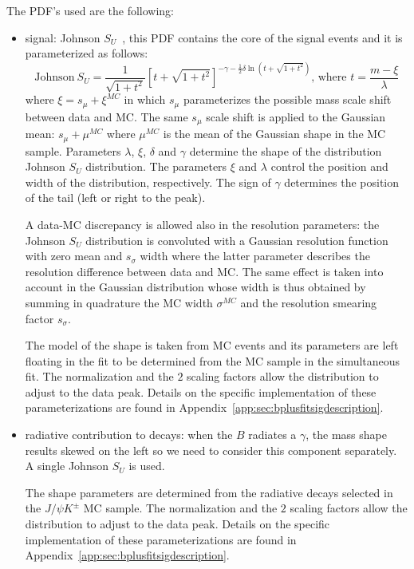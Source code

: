 The PDF's used are the following:
\begin{itemize}
    \setlength{\itemsep}{0pt}%
	\setlength{\parskip}{0pt}%
    \item \BpmKpmJpsi{} signal:
	Johnson $S_U$~\cite{Johnson}, this PDF contains the core of the signal events and
	it is parameterized as follows:
	\begin{equation}
	    \mathrm{Johnson}~S_U =
	    \frac{1}{\sqrt{1+t^2}}\left[t+\sqrt{1+t^2}\right]^{-\gamma-\frac{1}{2}\delta\ln{(t+\sqrt{1+t^2})}} \text{, where } t = \frac{m-\xi}{\lambda}
	\end{equation}
	where $\xi = s_\mu + \xi^{MC}$ in which $s_\mu$ parameterizes the
	possible mass scale shift between data and MC. The same $s_\mu$
	scale shift is applied to the Gaussian mean: $s_\mu+\mu^{MC}$ where
	$\mu^{MC}$ is the mean of the Gaussian shape in the \BpmKpmJpsi{} MC sample.
	Parameters $\lambda$, $\xi$, $\delta$ and $\gamma$ determine the shape
	of the distribution Johnson $S_U$ distribution. The parameters $\xi$
	and $\lambda$ control the position and width of the distribution,
	respectively. The sign of $\gamma$ determines the position of
	the tail (left or right to the peak).

	A data-MC discrepancy is allowed also in the resolution parameters:
	the Johnson $S_U$ distribution is convoluted with a Gaussian resolution function
	with zero mean and $s_\sigma$ width where the latter parameter describes 
	the resolution difference between data and MC.
	The same effect is taken into account in the Gaussian distribution
	whose width is thus obtained by summing in quadrature the MC width
	$\sigma^{MC}$ and the resolution smearing factor $s_\sigma$.

	The model of the shape is taken from \BpmKpmJpsi{} MC events
	and its parameters are left floating in the fit to be determined from
	the \BpmKpmJpsi{} MC sample in the simultaneous fit.
	The normalization and the $2$ scaling factors allow the distribution to
	adjust to the data peak.
	Details on the specific implementation of these parameterizations
	are found in Appendix~\ref{app:sec:bplusfitsigdescription}.

    \item radiative contribution to \BpmKpmJpsi{} decays: when the $B$ radiates a $\gamma$,
	the mass shape results skewed on the left so we need to consider
	this component separately. A single Johnson $S_U$ is used. 

	The shape parameters are determined from the radiative decays selected
	in the $J/\psi K^\pm$ MC sample.
	The normalization and the $2$ scaling factors allow the distribution to
	adjust to the data peak.
	Details on the specific implementation of these parameterizations
	are found in Appendix~\ref{app:sec:bplusfitsigdescription}.


\end{itemize}

